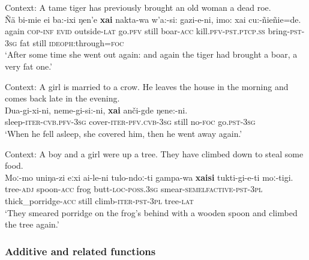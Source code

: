 \begin{exe}
	\ex\label{exAppendixUdiheIterative5}
	Context: A tame tiger has previously brought an old woman a dead roe.\\
	\gll Ñä bi-mie ei ba:-ixi ŋen'e \textbf{xai} nakta-wa w'a:-si: gazi-e-ni, imo: xai cu:-ñieñie=de.\\
	again \textsc{cop}-\textsc{inf} \textsc{evid} outside-\textsc{lat} go.\textsc{pfv} still boar-\textsc{acc} kill.\textsc{pfv}-\textsc{pst}.\textsc{ptcp}.\textsc{ss} bring-\textsc{pst}-3\textsc{sg} fat still \textsc{ideoph}:through=\textsc{foc}\\
	\glt \lq After some time she went out again: and again the tiger had brought a boar, a very fat one.\rq{ }\parencite[An old woman and her tiger cub]{NikolaevaEtAl2019}
	
	\ex Context: A girl is married to a crow. He leaves  the house in the morning and comes back late in the evening.\label{exAppendixUdiheRestitutive1}\\
 \gll Ŋua-gi-xi-ni, neme-gi-si:-ni, \textbf{xai} anči-gde ŋene:-ni.\\
	sleep-\textsc{iter}-\textsc{cvb}.\textsc{pfv}-3\textsc{sg}  cover-\textsc{iter}-\textsc{pfv}.\textsc{cvb}-3\textsc{sg}  still no-\textsc{foc}  go.\textsc{pst}-3\textsc{sg}\\
	\glt \lq When he fell asleep, she covered him, then he went away again.\rq{ }\parencite[169, 171]{NikolaevaEtAl2003} 	
	
	\ex\label{exAppendixUdiheRestitutive2}
	Context: A boy and a girl were up a tree. They have climbed down to steal some food.\\
\gll  Moː-mo uniŋa-zi eːxi ai-le-ni tulo-ndoː-ti gampa-wa \textbf{xaisi} tukti-gi-e-ti moː-tigi.\\
	tree-\textsc{adj} spoon-\textsc{acc} frog butt-\textsc{loc}-\textsc{poss}.3\textsc{sg} smear-\textsc{semelfactive}-\textsc{pst}-3\textsc{pl} thick\_porridge-\textsc{acc} still climb-\textsc{iter}-\textsc{pst}-3\textsc{pl} tree-\textsc{lat}\\
	\glt \lq They smeared porridge on the frog’s behind with a wooden spoon and climbed the tree again.'  \parencite[169, 171]{NikolaevaEtAl2002}
\end{exe}

\subsubsection{Additive and related functions}
